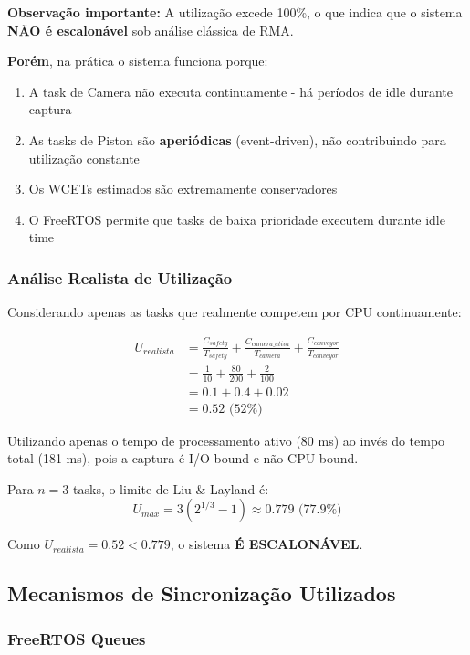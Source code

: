 \documentclass[12pt,a4paper]{article}
\begin{document}
\textbf{Observação importante:} A utilização excede 100\%, o que indica que o sistema \textbf{NÃO é escalonável} sob análise clássica de RMA.

\textbf{Porém}, na prática o sistema funciona porque:

\begin{enumerate}
    \item A task de Camera não executa continuamente - há períodos de idle durante captura
    \item As tasks de Piston são \textbf{aperiódicas} (event-driven), não contribuindo para utilização constante
    \item Os WCETs estimados são extremamente conservadores
    \item O FreeRTOS permite que tasks de baixa prioridade executem durante idle time
\end{enumerate}

\subsubsection{Análise Realista de Utilização}

Considerando apenas as tasks que realmente competem por CPU continuamente:

\begin{align}
U_{realista} &= \frac{C_{safety}}{T_{safety}} + \frac{C_{camera\_ativa}}{T_{camera}} + \frac{C_{conveyor}}{T_{conveyor}} \\
&= \frac{1}{10} + \frac{80}{200} + \frac{2}{100} \\
&= 0.1 + 0.4 + 0.02 \\
&= 0.52 \text{ (52\%)}
\end{align}

Utilizando apenas o tempo de processamento ativo (80 ms) ao invés do tempo total (181 ms), pois a captura é I/O-bound e não CPU-bound.

Para $n=3$ tasks, o limite de Liu \& Layland é:
\begin{equation}
U_{max} = 3(2^{1/3} - 1) \approx 0.779 \text{ (77.9\%)}
\end{equation}

Como $U_{realista} = 0.52 < 0.779$, o sistema \textbf{É ESCALONÁVEL}.

\subsection{Mecanismos de Sincronização Utilizados}

\subsubsection{FreeRTOS Queues}
\end{document}
